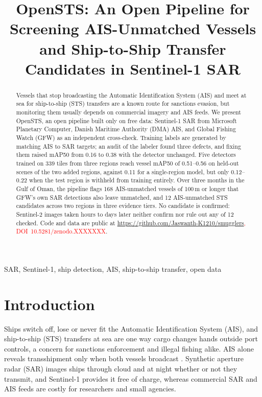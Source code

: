\documentclass[conference]{IEEEtran}
\newcommand{\tbd}[1]{\textcolor{red}{#1}}
\begin{document}
\title{OpenSTS: An Open Pipeline for Screening AIS-Unmatched Vessels and
Ship-to-Ship Transfer Candidates in Sentinel-1 SAR}

\author{
}

\maketitle

\begin{abstract}
Vessels that stop broadcasting the Automatic Identification System (AIS) and meet at
sea for ship-to-ship (STS) transfers are a known route for sanctions evasion, but
monitoring them usually depends on commercial imagery and AIS feeds. We present OpenSTS,
an open pipeline built only on free data: Sentinel-1 SAR from Microsoft Planetary
Computer, Danish Maritime Authority (DMA) AIS, and Global Fishing Watch (GFW) as an
independent cross-check. Training labels are generated by matching AIS to SAR targets;
an audit of the labeler found three defects, and fixing them raised mAP50 from 0.16 to
0.38 with the detector unchanged. Five detectors trained on 339 tiles from three regions
reach vessel mAP50 of 0.51--0.56 on held-out scenes of the two added regions, against
0.11 for a single-region model, but only 0.12--0.22 when the test region is withheld
from training entirely. Over three months in the Gulf of Oman, the pipeline
flags 168 AIS-unmatched vessels of 100\,m or longer that GFW's own SAR detections also
leave unmatched, and 12 AIS-unmatched STS candidates across two regions in three
evidence tiers. No candidate is confirmed: Sentinel-2 images taken hours to days later
neither confirm nor rule out any of 12 checked. Code and data are public at
\tbd{\url{https://github.com/Jaswanth-K1210/smugglers}, DOI~10.5281/zenodo.XXXXXXX}.
\end{abstract}

\begin{IEEEkeywords}
SAR, Sentinel-1, ship detection, AIS, ship-to-ship transfer, open data
\end{IEEEkeywords}

\section{Introduction}
\label{sec:intro}
Ships switch off, lose or never fit the Automatic Identification System (AIS), and
ship-to-ship (STS) transfers at sea are one way cargo changes hands outside port
controls, a concern for sanctions enforcement and illegal fishing alike. AIS alone
reveals transshipment only when both vessels broadcast \cite{miller2018}. Synthetic
aperture radar (SAR) images ships through cloud and at night whether or not they
transmit, and Sentinel-1 \cite{torres2012} provides it free of charge, whereas
commercial SAR and AIS feeds are costly for researchers and small agencies.
\end{document}
